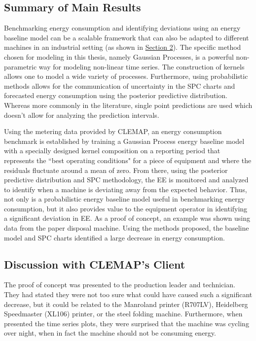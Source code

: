 \subsection{Summary of Main Results}

Benchmarking energy consumption and identifying deviations using an energy baseline model can be a scalable framework that can also be adapted to different machines in an industrial setting (as shown in \hyperlink{section.2}{Section 2}). The specific method chosen for modeling in this thesis, namely Gaussian Processes, is a powerful non-parametric way for modeling non-linear time series. The construction of kernels allows one to model a wide variety of processes. Furthermore, using probabilistic methods allows for the communication of uncertainty in the SPC charts and forecasted energy consumption using the posterior predictive distribution. Whereas more commonly in the literature, single point predictions are used which doesn't allow for analyzing the prediction intervals. 

Using the metering data provided by CLEMAP, an energy consumption benchmark is established by training a Gaussian Process energy baseline model with a specially designed kernel composition on a reporting period that represents the ``best operating conditions" for a piece of equipment and where the residuals fluctuate around a mean of zero. From there, using the posterior predictive distribution and SPC methodology, the EE is monitored and analyzed to identify when a machine is deviating away from the expected behavior. Thus, not only is a probabilistic energy baseline model useful in benchmarking energy consumption, but it also provides value to the equipment operator in identifying a significant deviation in EE. As a proof of concept, an example was shown using data from the paper disposal machine. Using the methods proposed, the baseline model and SPC charts identified a large decrease in energy consumption. 

\subsection{Discussion with CLEMAP's Client}

The proof of concept was presented to the production leader and technician. They had stated they were not too sure what could have caused such a significant decrease, but it could be related to the Manroland printer (R707LV), Heidelberg Speedmaster (XL106) printer, or the steel folding machine. Furthermore, when presented the time series plots, they were surprised that the machine was cycling over night, when in fact the machine should not be consuming energy.

